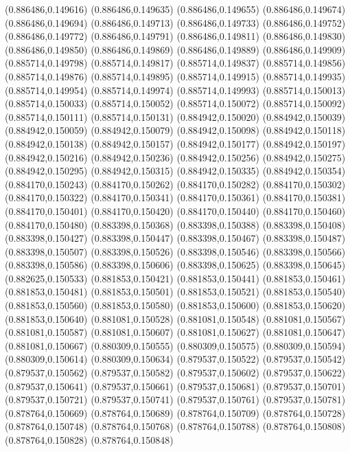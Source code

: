 (0.886486,0.149616)
(0.886486,0.149635)
(0.886486,0.149655)
(0.886486,0.149674)
(0.886486,0.149694)
(0.886486,0.149713)
(0.886486,0.149733)
(0.886486,0.149752)
(0.886486,0.149772)
(0.886486,0.149791)
(0.886486,0.149811)
(0.886486,0.149830)
(0.886486,0.149850)
(0.886486,0.149869)
(0.886486,0.149889)
(0.886486,0.149909)
(0.885714,0.149798)
(0.885714,0.149817)
(0.885714,0.149837)
(0.885714,0.149856)
(0.885714,0.149876)
(0.885714,0.149895)
(0.885714,0.149915)
(0.885714,0.149935)
(0.885714,0.149954)
(0.885714,0.149974)
(0.885714,0.149993)
(0.885714,0.150013)
(0.885714,0.150033)
(0.885714,0.150052)
(0.885714,0.150072)
(0.885714,0.150092)
(0.885714,0.150111)
(0.885714,0.150131)
(0.884942,0.150020)
(0.884942,0.150039)
(0.884942,0.150059)
(0.884942,0.150079)
(0.884942,0.150098)
(0.884942,0.150118)
(0.884942,0.150138)
(0.884942,0.150157)
(0.884942,0.150177)
(0.884942,0.150197)
(0.884942,0.150216)
(0.884942,0.150236)
(0.884942,0.150256)
(0.884942,0.150275)
(0.884942,0.150295)
(0.884942,0.150315)
(0.884942,0.150335)
(0.884942,0.150354)
(0.884170,0.150243)
(0.884170,0.150262)
(0.884170,0.150282)
(0.884170,0.150302)
(0.884170,0.150322)
(0.884170,0.150341)
(0.884170,0.150361)
(0.884170,0.150381)
(0.884170,0.150401)
(0.884170,0.150420)
(0.884170,0.150440)
(0.884170,0.150460)
(0.884170,0.150480)
(0.883398,0.150368)
(0.883398,0.150388)
(0.883398,0.150408)
(0.883398,0.150427)
(0.883398,0.150447)
(0.883398,0.150467)
(0.883398,0.150487)
(0.883398,0.150507)
(0.883398,0.150526)
(0.883398,0.150546)
(0.883398,0.150566)
(0.883398,0.150586)
(0.883398,0.150606)
(0.883398,0.150625)
(0.883398,0.150645)
(0.882625,0.150533)
(0.881853,0.150421)
(0.881853,0.150441)
(0.881853,0.150461)
(0.881853,0.150481)
(0.881853,0.150501)
(0.881853,0.150521)
(0.881853,0.150540)
(0.881853,0.150560)
(0.881853,0.150580)
(0.881853,0.150600)
(0.881853,0.150620)
(0.881853,0.150640)
(0.881081,0.150528)
(0.881081,0.150548)
(0.881081,0.150567)
(0.881081,0.150587)
(0.881081,0.150607)
(0.881081,0.150627)
(0.881081,0.150647)
(0.881081,0.150667)
(0.880309,0.150555)
(0.880309,0.150575)
(0.880309,0.150594)
(0.880309,0.150614)
(0.880309,0.150634)
(0.879537,0.150522)
(0.879537,0.150542)
(0.879537,0.150562)
(0.879537,0.150582)
(0.879537,0.150602)
(0.879537,0.150622)
(0.879537,0.150641)
(0.879537,0.150661)
(0.879537,0.150681)
(0.879537,0.150701)
(0.879537,0.150721)
(0.879537,0.150741)
(0.879537,0.150761)
(0.879537,0.150781)
(0.878764,0.150669)
(0.878764,0.150689)
(0.878764,0.150709)
(0.878764,0.150728)
(0.878764,0.150748)
(0.878764,0.150768)
(0.878764,0.150788)
(0.878764,0.150808)
(0.878764,0.150828)
(0.878764,0.150848)
